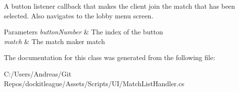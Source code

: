 A button listener callback that makes the client join the match that has been selected. Also navigates to the lobby menu screen. 


\begin{DoxyParams}{Parameters}
{\em button\+Number} & The index of the button\\
\hline
{\em match} & The match maker match\\
\hline
\end{DoxyParams}


The documentation for this class was generated from the following file\+:\begin{DoxyCompactItemize}
\item 
C\+:/\+Users/\+Andreas/\+Git Repos/dockitleague/\+Assets/\+Scripts/\+U\+I/Match\+List\+Handler.\+cs\end{DoxyCompactItemize}
